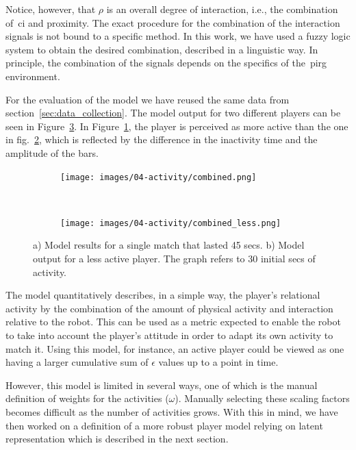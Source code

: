 Notice, however, that $\rho$ is an overall degree of interaction, i.e., the combination of~\gls{ci} and proximity. The exact procedure for the combination of the interaction signals is not bound to a specific method. In this work, we have used a fuzzy logic system to obtain the desired combination, described in a linguistic way. In principle, the combination of the signals depends on the specifics of the~\gls{pirg} environment.

For the evaluation of the model we have reused the same data from section~\ref{sec:data_collection}. The model output for two different players can be seen in Figure~\ref{fig:model_output}. In Figure~\ref{fig:fun}, the player is perceived as more active than the one in fig.~\ref{fig:nofun}, which is reflected by the difference in the inactivity time and the amplitude of the bars.

\begin{figure}[h]
    \centering 
	\begin{subfigure}[h]{5cm}
		\centering      
		\texttt{[image: images/04-activity/combined.png]}
		\caption{}
		\label{fig:fun}
	\end{subfigure}
	~
	\begin{subfigure}[h]{5cm}
		\centering      
      	\texttt{[image: images/04-activity/combined\_less.png]}
      	\caption{}
      	\label{fig:nofun}
     \end{subfigure}
      \caption{a) Model results for a single match that lasted 45 secs. b) Model output for a less active player. The graph refers to 30 initial secs of activity.}		
      \label{fig:model_output}
\end{figure}

The model quantitatively describes, in a simple way, the player's relational activity by the combination of the amount of physical activity and interaction relative to the robot. This can be used as a metric expected to enable the robot to take into account the player's attitude in order to adapt its own activity to match it. Using this model, for instance, an active player could be viewed as one having a larger cumulative sum of $\epsilon$ values up to a point in time.

However, this model is limited in several ways, %
one of which is the manual definition of weights for the activities ($\omega$). Manually selecting these scaling factors becomes difficult as the number of activities grows. With this in mind, we have then worked on a definition of a more robust player model relying on latent representation which is described in the next section.

